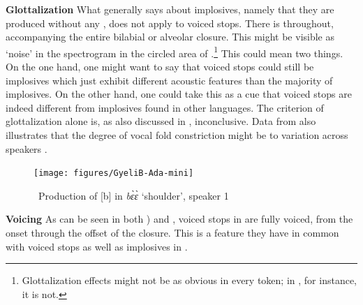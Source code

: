 \documentclass[output=paper]{LSP/langsci}
\begin{document}
{\bf Glottalization} What \citet[28]{Maddieson2003} generally says about  implosives, namely that they are produced without any , does not apply to  voiced stops. There is  throughout, accompanying the entire bilabial or alveolar closure. This might be visible as `noise' in the spectrogram in the circled area of .\footnote{Glottalization effects might not be as obvious in every token; in , for instance, it is not.} This could mean two things. On the one hand, one might want to say that  voiced stops could still be implosives which just exhibit different acoustic features than the majority of  implosives. On the other hand, one could take this as a cue that  voiced stops are indeed different from implosives found in other  languages. The criterion of glottalization alone is, as also discussed in , inconclusive. Data from  also illustrates that the degree of vocal fold constriction might be  to variation across speakers \citep[75]{Nagano2012}. 

\begin{figure}[h!]
\caption{\ Production of [b] in {\it bɛ̀ɛ̀} `shoulder', speaker 1}
\label{fig:grimm:2}
\texttt{[image: figures/GyeliB-Ada-mini]}
\end{figure}

{\bf Voicing} As can be seen in both ) and , voiced stops in  are fully voiced, from the onset through the offset of the closure. This is a feature they have in common with voiced stops as well as implosives in  \citep[74]{Nagano2012}.
\end{document}
